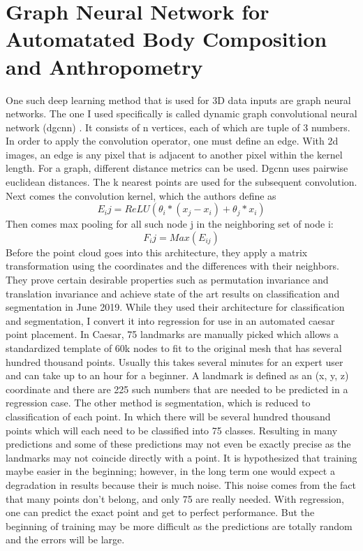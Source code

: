 \section{Graph Neural Network for Automatated Body Composition and Anthropometry}
One such deep learning method that is used for 3D data inputs are graph neural networks. The one I used specifically is called dynamic graph convolutional neural network (dgcnn) \cite{DBLP:journals/corr/abs-1801-07829}. It consists of n vertices, each of which are tuple of 3 numbers. In order to apply the convolution operator, one must define an edge. With 2d images, an edge is any pixel that is adjacent to another pixel within the kernel length. For a graph, different distance metrics can be used. Dgcnn uses pairwise euclidean distances. The k nearest points are used for the subsequent convolution. Next comes the convolution kernel, which the authors define as
\begin{equation}
	E_ij = ReLU(\theta_i * (x_j - x_i) + \theta_j * x_i)
\end{equation}
Then comes max pooling for all such node j in the neighboring set of node i:
\begin{equation}
F_ij = Max(E_{ij})
\end{equation}
Before the point cloud goes into this architecture, they apply a matrix transformation using the coordinates and the differences with their neighbors.
They prove certain desirable properties such as permutation invariance and translation invariance and achieve state of the art results on classification and segmentation in June 2019.
While they used their architecture for classification and segmentation, I convert it into regression for use in an automated caesar point placement. In Caesar, 75 landmarks are manually picked which allows a standardized template of 60k nodes to fit to the original mesh that has several hundred thousand points. Usually this takes several minutes for an expert user and can take up to an hour for a beginner.
A landmark is defined as an (x, y, z) coordinate and there are 225 such numbers that are needed to be predicted in a regression case. The other method is segmentation, which is reduced to classification of each point. In which there will be several hundred thousand points which will each need to be classified into 75 classes. Resulting in many predictions and some of these predictions may not even be exactly precise as the landmarks may not coincide directly with a point. It is hypothesized that training maybe easier in the beginning; however, in the long term one would expect a degradation in results because their is much noise. This noise comes from the fact that many points don't belong, and only 75 are really needed. With regression, one can predict the exact point and get to perfect performance. But the beginning of training may be more difficult as the predictions are totally random and the errors will be large.
